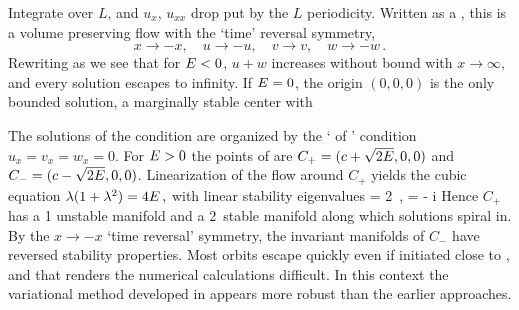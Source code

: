 
\bigskip

 Integrate over $L$, and $u_x$, $u_{xx}$ drop put by the
  $L$ periodicity.
 Written as a ,
 this is a volume preserving flow
 with the `time' reversal symmetry,
 \[
 x \to -x,\quad u \to -u, \quad v \to v, \quad w \to -w \,.
 \]
  Rewriting  as
 \beq
 we see that
 for $E<0$,
 $u+w$ increases without bound with $x \to \infty$,
 and every solution escapes to infinity.
 If $E=0$, the origin $(0,0,0)$ is the
 only bounded  solution, a marginally stable center with

\bigskip

 The solutions of the {\eqv}  condition
  are
 organized by the
 `{\eqva}  of {\eqva}'  condition
 \( u_x= v_x= w_x= 0 \).
     For $E>0$ the {\reqva}  points of  are
 $C_{+}=(c+\sqrt{2E},0,0)$ and $C_{-}=(c-\sqrt{2E},0,0)$.
 Linearization of the flow around $C_{+}$ yields the cubic equation
 $ %
 \eigExp(1+\eigExp^2) = 4 \expctE
 \,,
 $ %
 with linear stability eigenvalues
 \beq
 \eigExp[1] = 2 \eigRe
     \,,\qquad
 \eigExp[2,3] = - \eigRe \pm i \eigIm
 Hence $C_{+}$ has a {1\dmn}
 unstable manifold and a 2\dmn\ stable manifold
 along which solutions spiral in.
 By the $x \to -x$ `time reversal' symmetry, the
 invariant manifolds of $C_{-}$
 have reversed stability properties.
 Most orbits escape quickly even if initiated close to \eqva, and that
 renders the numerical calculations
 difficult.
 In this context the variational method
 developed in 
 appears more robust than
 the earlier approaches.

